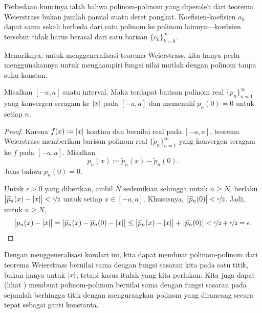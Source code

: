 Perbedaan kuncinya ialah bahwa
polinom-polinom yang diperoleh dari teorema Weierstrass bukan jumlah parsial
suatu deret pangkat. Koefisien-koefisien $a_k$ dapat sama sekali berbeda dari
satu polinom ke polinom lainnya---koefisien tersebut tidak harus berasal dari satu barisan
$\{ c_k \}_{k=0}^\infty$.

\medskip

Menariknya, untuk menggeneralisasi teorema Weierstrass, kita hanya perlu
menggunakannya untuk menghampiri fungsi nilai mutlak dengan polinom tanpa
suku konstan.

\begin{cor}
Misalkan $[-a,a]$ suatu interval. Maka terdapat barisan polinom real
$\{ p_n \}_{n=1}^\infty$ yang konvergen seragam ke $\lvert {x} \rvert$ pada $[-a,a]$ dan
memenuhi $p_n(0) = 0$ untuk setiap $n$.
\end{cor}

\begin{proof}
Karena $f(x) \coloneqq \lvert {x} \rvert$ kontinu dan bernilai real
pada $[-a,a]$, teorema Weierstrass memberikan barisan
polinom real $\{ \widetilde{p}_n \}_{n=1}^\infty$ yang konvergen seragam ke $f$
pada $[-a,a]$. Misalkan
\begin{equation*}
p_n(x) \coloneqq \widetilde{p}_n(x) - \widetilde{p}_n(0) .
\end{equation*}
Jelas bahwa $p_n(0) = 0$.

Untuk $\epsilon > 0$ yang diberikan, ambil $N$ sedemikian sehingga
untuk $n \geq N$, berlaku
$\bigl\lvert\widetilde{p}_n(x)-\lvert {x} \rvert\big\rvert <
\nicefrac{\epsilon}{2}$ untuk setiap $x \in [-a,a]$.
Khususnya,
$\bigl\lvert {\widetilde{p}_n(0)} \bigr\rvert < \nicefrac{\epsilon}{2}$.
Jadi, untuk $n \geq N$,
\begin{equation*}
\bigl\lvert { p_n(x)-\lvert {x} \rvert } \bigr\rvert
=
\bigl\lvert { \widetilde{p}_n(x) - \widetilde{p}_n(0) - \lvert {x} \rvert } \bigr\rvert
\leq
\bigl\lvert { \widetilde{p}_n(x) - \lvert {x} \rvert } \bigr\rvert + \bigl\lvert {\widetilde{p}_n(0)} \bigr\rvert < 
\nicefrac{\epsilon}{2} + \nicefrac{\epsilon}{2} = \epsilon . \qedhere
\end{equation*}
\end{proof}

Dengan menggeneralisasi korolari ini, kita dapat membuat polinom-polinom dari
teorema Weierstrass bernilai sama dengan fungsi sasaran kita pada satu titik,
bukan hanya untuk $\lvert {x} \rvert$; tetapi kasus itulah yang kita perlukan. Kita juga
dapat (lihat
)
membuat polinom-polinom bernilai sama dengan fungsi sasaran pada sejumlah
berhingga titik dengan mengurangkan polinom yang dirancang secara tepat sebagai
ganti konstanta.

